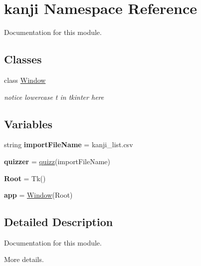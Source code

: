 \hypertarget{namespacekanji}{}\section{kanji Namespace Reference}
\label{namespacekanji}


Documentation for this module.  


\subsection*{Classes}
\begin{DoxyCompactItemize}
\item 
class \mbox{\hyperlink{classkanji_1_1_window}{Window}}
\begin{DoxyCompactList}\small\item\em notice lowercase \textquotesingle{}t\textquotesingle{} in tkinter here \end{DoxyCompactList}\end{DoxyCompactItemize}
\subsection*{Variables}
\begin{DoxyCompactItemize}
\item 
\mbox{\label{namespacekanji_a5dcd61090559ca1f7d0634c16d70dece}} 
string {\bfseries import\+File\+Name} = \textquotesingle{}kanji\+\_\+list.\+csv\textquotesingle{}
\item 
\mbox{\label{namespacekanji_a38ae58cad53b52973a5fcc8372ef1018}} 
{\bfseries quizzer} = \mbox{\hyperlink{classkanji__classes_1_1quizz}{quizz}}(import\+File\+Name)
\item 
\mbox{\label{namespacekanji_a35ae80c08b0d92cd42ca3eed304a2456}} 
{\bfseries Root} = Tk()
\item 
\mbox{\label{namespacekanji_aa0c4bb423a864fd4717179d496e52be2}} 
{\bfseries app} = \mbox{\hyperlink{classkanji_1_1_window}{Window}}(Root)
\end{DoxyCompactItemize}


\subsection{Detailed Description}
Documentation for this module. 

More details. 